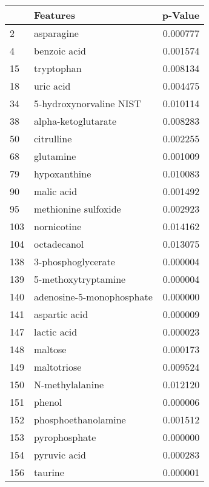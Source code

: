 \begin{tabular}{llr}
\toprule
 & Features & p-Value \\
\midrule
2 & asparagine & 0.000777 \\
4 & benzoic acid & 0.001574 \\
15 & tryptophan & 0.008134 \\
18 & uric acid & 0.004475 \\
34 & 5-hydroxynorvaline NIST & 0.010114 \\
38 & alpha-ketoglutarate & 0.008283 \\
50 & citrulline & 0.002255 \\
68 & glutamine & 0.001009 \\
79 & hypoxanthine & 0.010083 \\
90 & malic acid & 0.001492 \\
95 & methionine sulfoxide & 0.002923 \\
103 & nornicotine & 0.014162 \\
104 & octadecanol & 0.013075 \\
138 & 3-phosphoglycerate & 0.000004 \\
139 & 5-methoxytryptamine & 0.000004 \\
140 & adenosine-5-monophosphate & 0.000000 \\
141 & aspartic acid & 0.000009 \\
147 & lactic acid & 0.000023 \\
148 & maltose & 0.000173 \\
149 & maltotriose & 0.009524 \\
150 & N-methylalanine & 0.012120 \\
151 & phenol & 0.000006 \\
152 & phosphoethanolamine & 0.001512 \\
153 & pyrophosphate & 0.000000 \\
154 & pyruvic acid & 0.000283 \\
156 & taurine & 0.000001 \\
\bottomrule
\end{tabular}
